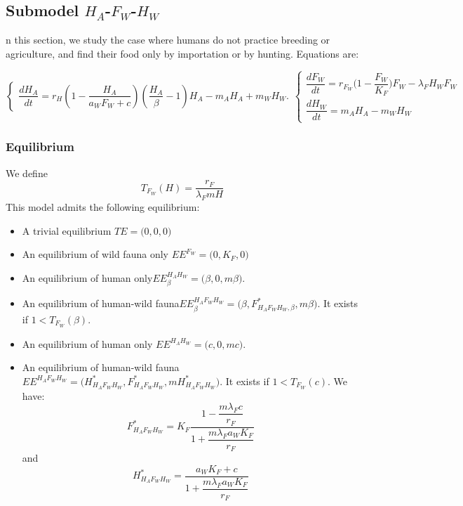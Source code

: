 \documentclass{article}
\newcommand{\lfw}{\lambda_{F}}
\begin{document}
\subsection{Submodel $H_A$-$F_W$-$H_W$}
n this section, we study the case where humans do not practice breeding or agriculture, and find their food only by importation or by hunting. Equations are:

\begin{subequations}
\begin{equation}
\left\{ \begin{array}{l}
\dfrac{dH_A}{dt}=r_{H}\left(1-\dfrac{H_A}{a_W F_W + c}\right)\left(\dfrac{H_A}{\beta}-1\right)H_A -m_A H_A + m_W H_W.
\end{array}\right.
\end{equation}
\begin{equation}
\left\lbrace \begin{array}{l}
\dfrac{dF_W}{dt} = r_{F_W} \Big(1 - \dfrac{F_W}{K_F}\Big) F_W - \lfw H_W F_W\\
\dfrac{dH_W}{dt}= m_A H_A - m_W H_W 
\end{array} \right.
\end{equation}
\label{anthropicWild:VW=KV:Functional:subHAFWHW}
\end{subequations}


\subsubsection{Equilibrium}
We define 
$$
T_{F_W}(H) = \dfrac{r_F}{\lfw m H}
$$
This model admits the following equilibrium:
\begin{itemize}
\item A trivial equilibrium $TE = \Big(0,0,0\Big)$
\item An equilibrium of wild fauna only $EE^{F_W} = \Big(0,K_F,0\Big)$
\item An equilibrium of human only$EE^{H_AH_W}_\beta = \Big(\beta,0,m \beta \Big)$.
\item An equilibrium of human-wild fauna$EE^{H_AF_WH_W}_\beta = \Big(\beta,F^*_{H_AF_WH_W,\beta},m \beta \Big)$. It exists if $1 < T_{F_W}(\beta)$.
\item An equilibrium of human only $EE^{H_AH_W} = \Big(c,0,m c \Big)$.
\item An equilibrium of human-wild fauna$EE^{H_AF_WH_W} = \Big(H^*_{H_AF_WH_W},F^*_{H_AF_WH_W},m H^*_{H_AF_WH_W} \Big)$. It exists if $1 < T_{F_W}(c)$. We have:
$$F^*_{H_AF_WH_W} = K_F \dfrac{1 - \dfrac{m \lfw c}{r_F}}{1 + \dfrac{m \lfw a_W K_F}{r_F}}$$
and 
$$H^*_{H_AF_WH_W} = \dfrac{a_W K_F + c}{1 + \dfrac{m \lfw a_W K_F}{r_F}}$$
\end{itemize}
\end{document}
